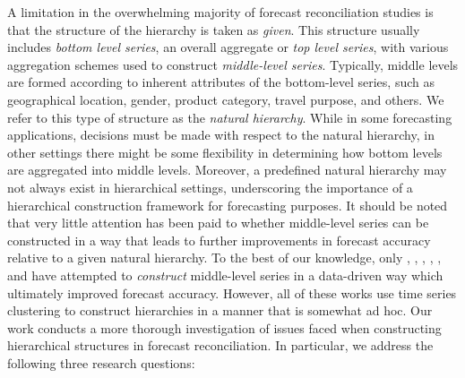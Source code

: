 \documentclass[a4paper,review,12pt,authoryear]{elsarticle}
\begin{document}
A limitation in the overwhelming majority of forecast reconciliation studies is that the structure of the hierarchy is taken as \textit{given}. This structure usually includes \textit{bottom level series}, an overall aggregate or \textit{top level series}, with various aggregation schemes used to construct \textit{middle-level series}. Typically, middle levels are formed according to inherent attributes of the bottom-level series, such as geographical location, gender, product category, travel purpose, and others. We refer to this type of structure as the \textit{natural hierarchy}. While in some forecasting applications, decisions must be made with respect to the natural hierarchy, in other settings there might be some flexibility in determining how bottom levels are aggregated into middle levels. Moreover, a predefined natural hierarchy may not always exist in hierarchical settings, underscoring the importance of a hierarchical construction framework for forecasting purposes. It should be noted that very little attention has been paid to whether middle-level series can be constructed in a way that leads to further improvements in forecast accuracy relative to a given natural hierarchy. {\color{purple}To the best of our knowledge, only \cite{yang2017reconciling}, \cite{pangHierarchicalElectricityTime2018}, \cite{liForecastReconciliationApproach2019}, \cite{pangHierarchicalElectricityTime2022}, \cite{cini2023graph}, and \cite{matteraImprovingOutofSampleForecasts2023} have attempted to \textit{construct} middle-level series in a data-driven way which ultimately improved forecast accuracy. } However, all of these works use time series clustering to construct hierarchies in a manner that is somewhat ad hoc. Our work conducts a more thorough investigation of issues faced when  constructing hierarchical structures in forecast reconciliation. In particular, we address the following three research questions:%



\end{document}

